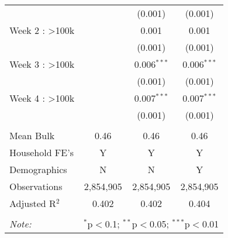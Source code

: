 \begin{table}[!htbp]
\begin{tabular}{@{\extracolsep{5pt}}lccc}
  &  & (0.001) & (0.001) \\ 
  Week 2 : >100k &  & 0.001 & 0.001 \\ 
  &  & (0.001) & (0.001) \\ 
  Week 3 : >100k &  & 0.006$^{***}$ & 0.006$^{***}$ \\ 
  &  & (0.001) & (0.001) \\ 
  Week 4 : >100k &  & 0.007$^{***}$ & 0.007$^{***}$ \\ 
  &  & (0.001) & (0.001) \\ 
 \hline \\[-1.8ex] 
Mean Bulk & 0.46 & 0.46 & 0.46 \\ 
Household FE's & Y & Y & Y \\ 
Demographics & N & N & Y \\ 
Observations & 2,854,905 & 2,854,905 & 2,854,905 \\ 
Adjusted R$^{2}$ & 0.402 & 0.402 & 0.404 \\ 
\hline 
\hline \\[-1.8ex] 
\textit{Note:}  & \multicolumn{3}{l}{$^{*}$p$<$0.1; $^{**}$p$<$0.05; $^{***}$p$<$0.01} \\ 
\end{tabular} 
\end{table} 
